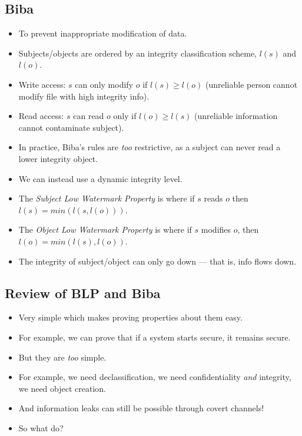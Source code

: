 \documentclass{article}
\begin{document}
\subsection{Biba}
\begin{itemize}
    \item To prevent inappropriate modification of data.
    \item Subjects/objects are ordered by an integrity classification scheme, $l(s)$ and $l(o)$.
    \item Write access: $s$ can only modify $o$ if $l(s) \geq l(o)$ (unreliable person cannot modify file with high integrity info).
    \item Read access: $s$ can read $o$ only if $l(o) \geq l(s)$ (unreliable information cannot contaminate subject).
    \item In practice, Biba's rules are \emph{too} restrictive, as a subject can never read a lower integrity object.
    \item We can instead use a dynamic integrity level.
    \item The \emph{Subject Low Watermark Property} is where if $s$ reads $o$ then $l(s) = min(l(s, l(o)))$.
    \item The \emph{Object Low Watermark Property} is where if $s$ modifies $o$, then $l(o) = min(l(s), l(o))$.
    \item The integrity of subject/object can only go down --- that is, info flows down.
\end{itemize}

\subsection{Review of BLP and Biba}
\begin{itemize}
    \item Very simple which makes proving properties about them easy.
    \item For example, we can prove that if a system starts secure, it remains secure.
    \item But they are \emph{too} simple.
    \item For example, we need declassification, we need confidentiality \emph{and} integrity, we need object creation.
    \item And information leaks can still be possible through covert channels!
    \item So what do?
\end{itemize}
\end{document}
